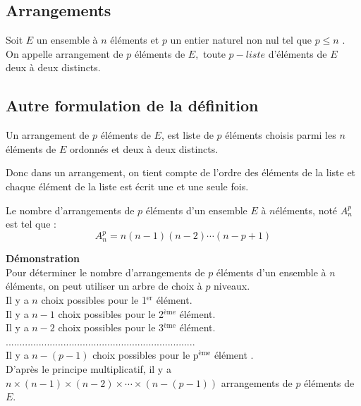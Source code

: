 \subsection{Arrangements}
\begin{definition}
Soit $ E $ un ensemble à $ n $ éléments et $ p $ un entier naturel non nul tel que $p\leq n  $ .\\
On appelle  arrangement  de $ p  $ éléments  de $ E,$ toute $ p-liste $ d'éléments de $ E $ deux à deux distincts.
\end{definition}
\subsection*{Autre formulation de la définition}
Un arrangement de $ p $ éléments de $ E $, est liste  de $ p $ éléments choisis parmi les $ n $ éléments de $ E $ ordonnés et deux à deux  distincts.
\begin{remark}
Donc dans un arrangement, on tient compte de l'ordre des éléments de la liste et chaque élément de la liste est  écrit une et une seule fois.
\end{remark}
\begin{theorem}
Le nombre d'arrangements de $ p $ éléments  d'un ensemble $ E $ à $ n $éléments,  noté  $ A_{n}^{p} $  est tel que :
\[  A_{n}^{p}= n(n-1)(n-2)\cdots (n-p+1)\]
\end{theorem}
\textbf{Démonstration}\\
Pour déterminer le nombre d'arrangements de $ p $ éléments d'un ensemble à $ n $ éléments, on peut utiliser un arbre de choix  à $ p $ niveaux.\\
Il y a $ n $ choix possibles pour  le 1$^{\text{er}}$ élément.\\
Il y a $ n-1 $ choix possibles  pour le 2$^{\text{ème}}$ élément.\\
Il y a $ n-2 $ choix possibles pour le 3$^{\text{ème}}$ élément.\\
.....................................................................\\
Il y a $ n-(p-1) $ choix possibles pour  le p$^{\text{ème}}$ élément .\\
D'après le principe multiplicatif, il y a $ n \times ( n-1) \times (n-2) \times \cdots \times (n-(p-1)) $  arrangements de $ p $  éléments de $ E $.
